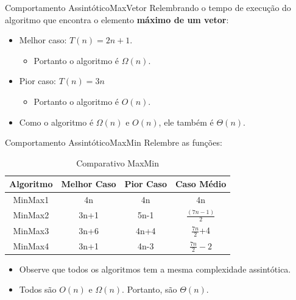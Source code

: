 \documentclass[aspectratio=169]{beamer}
\begin{document}

\begin{frame}{Comportamento Assintótico}{MaxVetor}
Relembrando o tempo de execução do algoritmo que encontra o elemento {\bf máximo de um vetor}:
\begin{itemize}
\item Melhor caso: $T(n) = 2n+1$.
\begin{itemize}
\item Portanto o algoritmo é $\Omega(n)$.
\end{itemize}
\item Pior caso: $T(n) = 3n$
\begin{itemize}
\item Portanto o algoritmo é $O(n)$.
\end{itemize}
\item Como o algoritmo é $\Omega(n)$ e $O(n)$, ele também é $\Theta(n)$. 
\end{itemize}
\end{frame}


\begin{frame}{Comportamento Assintótico}{MaxMin}
Relembre as funções:
\begin{table}[]
\centering
\caption{Comparativo MaxMin}
\begin{tabular}{c|ccc}
Algoritmo  &  Melhor Caso  &  Pior Caso  &  Caso Médio  \\
\hline
MinMax1  &   4n       &       4n   &  4n \\
MinMax2  &   3n+1     &       5n-1   &  $\frac{(7n -1)}{2}$ \\
MinMax3  &   3n+6     & 4n+4    &  $\frac{7n}{2}$+4 \\
MinMax4  &   3n+1     &      4n-3 &  $\frac{7n}{2}-2$ \\
\end{tabular}
\end{table}
\begin{itemize}
 \item Observe que todos os algoritmos tem a mesma complexidade assintótica.
 \item Todos são $O(n)$ e $\Omega(n)$. Portanto, são $\Theta(n)$.
\end{itemize}
\end{frame}
\end{document}
